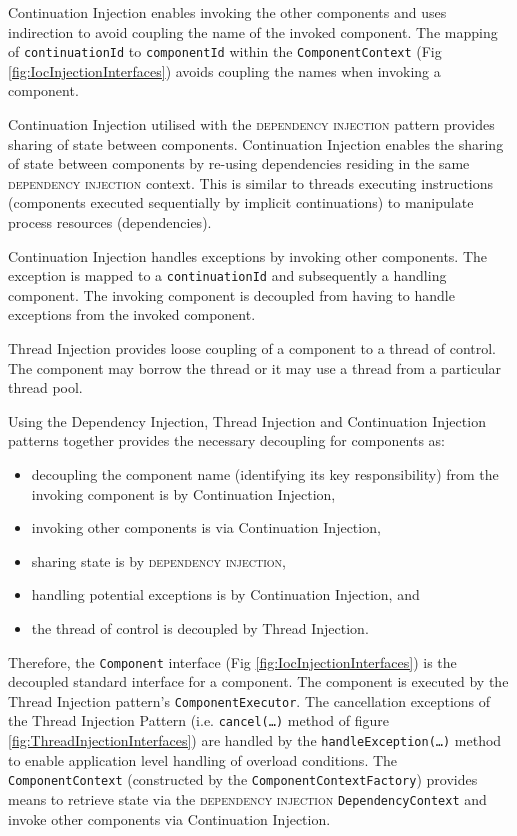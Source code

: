 \documentclass[prodmode]{style/acmlarge}
\begin{document}
Continuation Injection enables invoking the other components and uses
indirection to avoid coupling the name of the invoked component.  The mapping of
\texttt{continuationId} to \texttt{componentId} within the
\texttt{ComponentContext} (Fig \ref{fig:IocInjectionInterfaces}) avoids
coupling the names when invoking a component.

Continuation Injection utilised with the \textsc{dependency injection} pattern
\cite{ioc} provides sharing of state between components.  Continuation Injection
enables the sharing of state between components by re-using dependencies
residing in the same \textsc{dependency injection} context.  This is similar to
threads executing instructions (components executed sequentially by implicit
continuations) to manipulate process resources (dependencies).

Continuation Injection handles exceptions by invoking other components. The
exception is mapped to a \texttt{continuationId} and subsequently a handling
component.  The invoking component is decoupled from having to handle exceptions
from the invoked component.

Thread Injection provides loose coupling of a component to a thread of control.
The component may borrow the thread or it may use a thread from a particular
thread pool.

Using the Dependency Injection, Thread Injection and Continuation Injection
patterns together provides the necessary decoupling for components as:
\begin{itemize}
  \item decoupling the component name (identifying its key responsibility) from the invoking component is by Continuation Injection,
  \item invoking other components is via Continuation Injection,
  \item sharing state is by \textsc{dependency injection},
  \item handling potential exceptions is by Continuation Injection, and
  \item the thread of control is decoupled by Thread Injection.
\end{itemize}

Therefore, the \texttt{Component} interface (Fig
\ref{fig:IocInjectionInterfaces}) is the decoupled standard interface for a
component.  The component is executed by the Thread Injection pattern's
\texttt{ComponentExecutor}.  The cancellation exceptions of the Thread Injection
Pattern (i.e. \texttt{cancel(\ldots)} method of figure
\ref{fig:ThreadInjectionInterfaces}) are handled by the
\texttt{handleException(\ldots)} method to enable application level handling of
overload conditions.  The \texttt{ComponentContext} (constructed by the
\texttt{ComponentContextFactory}) provides means to retrieve state via the
\textsc{dependency injection} \texttt{Dependency\-Context} and invoke other
components via Continuation Injection.
\end{document}
